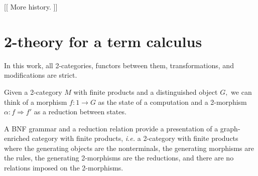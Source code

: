 \documentclass[]{acm_proc_article-sp}
\numberwithin{equation}{subsection}
\begin{document}
[[ More history. ]]

\section{2-theory for a term calculus}

\begin{comment}
  * 2-categories with finite products as presentations of configurations

      * problem with 2-morphisms as rewrites

          * normal order evaluation

          * pi calculus

      * reduction contexts as morphisms

          * linear use of reduction contexts in rewrites = number of processors

          * if reduction contexts are consumed, get a notion similar to Ethereum's gas

      * models in Cat

          * monad T

          * free model in Cat on empty category gives a quiver of terms & rewrites
\end{comment}

In this work, all 2-categories, functors between them, transformations, and modifications are strict.

Given a 2-category $M$ with finite products and a distinguished object $G,$ we can think of a morphism ${f\colon 1 \to G}$ as the state of a computation and a 2-morphism ${\alpha\colon f \Rightarrow f'}$ as a reduction between states.

A BNF grammar and a reduction relation provide a presentation of a graph-enriched category with finite products, {\em i.e.} a 2-category with finite products where the generating objects are the nonterminals, the generating morphisms are the rules, the generating 2-morphisms are the reductions, and there are no relations imposed on the 2-morphisms.
\end{document}
